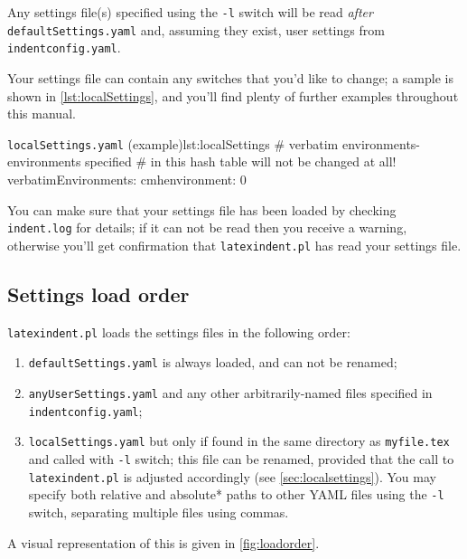 	Any settings file(s) specified using the \texttt{-l} switch will be read \emph{after} \texttt{defaultSettings.yaml} and, assuming they exist,
	user settings from \texttt{indentconfig.yaml}.

	Your settings file can contain any switches that you'd
	like to change; a sample is shown in \cref{lst:localSettings}, and you'll find plenty of further examples throughout this manual.

	\begin{yaml}{\texttt{localSettings.yaml} (example)}{lst:localSettings}
#  verbatim environments- environments specified
#  in this hash table will not be changed at all!
verbatimEnvironments:
    cmhenvironment: 0
\end{yaml}

	You can make sure that your settings file has been loaded by checking \texttt{indent.log}
	for details; if it can not be read then you receive a warning, otherwise you'll get confirmation that
	\texttt{latexindent.pl} has read your settings file.

\subsection{Settings load order}\label{sec:loadorder}
	\texttt{latexindent.pl} loads the settings files in the following order:
	\begin{enumerate}
		\item \texttt{defaultSettings.yaml} is always loaded, and can not be renamed;
		\item \texttt{anyUserSettings.yaml} and any other arbitrarily-named files specified in \texttt{indentconfig.yaml};
		\item \texttt{localSettings.yaml} but only if found in the same directory as \texttt{myfile.tex} and called
		      with \texttt{-l} switch; this file can be renamed, provided that the call to \texttt{latexindent.pl} is adjusted
		      accordingly (see \cref{sec:localsettings}). You may specify both relative and absolute* paths to other
		      YAML files using the \texttt{-l} switch, separating multiple files using commas.
	\end{enumerate}
	A visual representation of this is given in \cref{fig:loadorder}.

